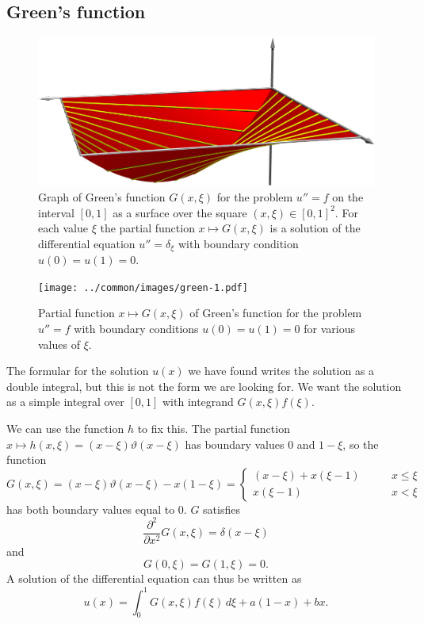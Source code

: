 \subsection{Green's function}
\begin{figure}
\begin{center}
\includegraphics[width=\hsize]{../common/3d/green.jpg}
\end{center}
\caption{Graph of Green's function $G(x,\xi)$ for the problem $u''=f$ 
on the interval $[0,1]$ as a surface over the square $(x,\xi)\in[0,1]^2$.
For each value $\xi$ the partial function
$x\mapsto G(x,\xi)$ is a solution of the differential equation
$u''=\delta_\xi$ with boundary condition $u(0)=u(1)=0$.
\label{elliptisch:green3dflaeche}}
\end{figure}
\begin{figure}
\begin{center}
\texttt{[image: ../common/images/green-1.pdf]}
\end{center}
\caption{Partial function $x\mapsto G(x,\xi)$ of Green's function
for the problem $u''=f$ with boundary conditions 
$u(0)=u(1)=0$ for various values of $\xi$.
\label{elliptisch:green1schar}}
\end{figure}

The formular for the solution $u(x)$ we have found writes the solution
as a double integral, but this is not the form we are looking for.
We want the solution as a simple integral over $[0,1]$ with integrand
$G(x,\xi) f(\xi)$.

We can use the function $h$ to fix this.
The partial function $x\mapsto h(x,\xi)=(x-\xi)\vartheta(x-\xi)$ has boundary
values $0$ and $1-\xi$, so the function
\[
G(x,\xi)
=
(x-\xi)\vartheta(x-\xi)-x(1-\xi)
=\begin{cases}
(x-\xi)+x(\xi-1)&\qquad x\le \xi \\
x(\xi-1)&\qquad x<\xi
\end{cases}
\]
has both boundary values equal to $0$.
$G$ satisfies
\[
\frac{\partial^2}{\partial x^2}G(x,\xi)=\delta(x-\xi)
\]
and
\[
G(0,\xi)=G(1,\xi)=0.
\]
A solution of the differential equation can thus be written as
\[
u(x)=\int_0^1G(x,\xi)f(\xi)\,d\xi+a(1-x)+bx.
\]

